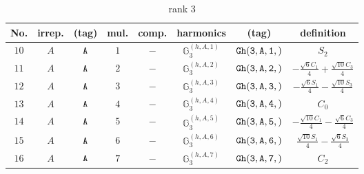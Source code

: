 \documentclass[fleqn,8pt]{jsarticle}
\begin{document}
\begin{table}[ht!]
\begin{center}
\caption{rank 3}
\renewcommand{\arraystretch}{1.3}
\begin{tabular}{cccccccc} \hline \hline
No. & irrep. & (tag) & mul. & comp. & harmonics & (tag) & definition \\ \hline
$ 10 $ & $ A $ & $ {\tt A} $ & $ 1 $ & $ - $ & $ \mathbb{G}_{3}^{(h,A,1)} $ & $ {\tt Gh(3,A,1,)} $ & $ S_{2} $ \\
$ 11 $ & $ A $ & $ {\tt A} $ & $ 2 $ & $ - $ & $ \mathbb{G}_{3}^{(h,A,2)} $ & $ {\tt Gh(3,A,2,)} $ & $ - \frac{\sqrt{6} C_{1}}{4} + \frac{\sqrt{10} C_{3}}{4} $ \\
$ 12 $ & $ A $ & $ {\tt A} $ & $ 3 $ & $ - $ & $ \mathbb{G}_{3}^{(h,A,3)} $ & $ {\tt Gh(3,A,3,)} $ & $ - \frac{\sqrt{6} S_{1}}{4} - \frac{\sqrt{10} S_{3}}{4} $ \\
$ 13 $ & $ A $ & $ {\tt A} $ & $ 4 $ & $ - $ & $ \mathbb{G}_{3}^{(h,A,4)} $ & $ {\tt Gh(3,A,4,)} $ & $ C_{0} $ \\
$ 14 $ & $ A $ & $ {\tt A} $ & $ 5 $ & $ - $ & $ \mathbb{G}_{3}^{(h,A,5)} $ & $ {\tt Gh(3,A,5,)} $ & $ - \frac{\sqrt{10} C_{1}}{4} - \frac{\sqrt{6} C_{3}}{4} $ \\
$ 15 $ & $ A $ & $ {\tt A} $ & $ 6 $ & $ - $ & $ \mathbb{G}_{3}^{(h,A,6)} $ & $ {\tt Gh(3,A,6,)} $ & $ \frac{\sqrt{10} S_{1}}{4} - \frac{\sqrt{6} S_{3}}{4} $ \\
$ 16 $ & $ A $ & $ {\tt A} $ & $ 7 $ & $ - $ & $ \mathbb{G}_{3}^{(h,A,7)} $ & $ {\tt Gh(3,A,7,)} $ & $ C_{2} $ \\
 \hline \hline
\end{tabular}
\end{center}
\end{table}
\end{document}

